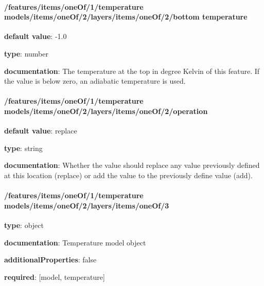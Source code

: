 \begin{itemized}
\end{itemized}\paragraph{/features/items/oneOf/1/temperature models/items/oneOf/2/layers/items/oneOf/2/bottom temperature} \begin{itemized}
\item {\bf default value}: -1.0
\item {\bf type}: number
\item {\bf documentation}: The temperature at the top in degree Kelvin of this feature. If the value is below zero, an adiabatic temperature is used.
\end{itemized}\paragraph{/features/items/oneOf/1/temperature models/items/oneOf/2/layers/items/oneOf/2/operation} \begin{itemized}
\item {\bf default value}: replace
\item {\bf type}: string
\item {\bf documentation}: Whether the value should replace any value previously defined at this location (replace) or add the value to the previously define value (add).
\end{itemized}\paragraph{/features/items/oneOf/1/temperature models/items/oneOf/2/layers/items/oneOf/3} \begin{itemized}
\item {\bf type}: object
\item {\bf documentation}: Temperature model object
\item {\bf additionalProperties}: false
\item {\bf required}: [model, temperature]\end{itemized}

